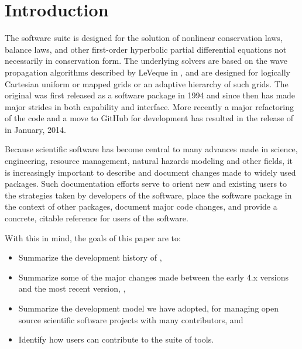 %
%
%

\section{Introduction}\label{sec:intro}

The \clawpack software suite \cite{clawpack} is designed for the solution of
nonlinear conservation laws, balance laws, and other first-order hyperbolic
partial differential equations not necessarily in conservation form.  The
underlying solvers are based on the wave propagation algorithms described by
LeVeque in \cite{rjl:fvmhp}, and are designed for logically Cartesian uniform or
mapped grids or an adaptive hierarchy of such grids.  The original \clawpack was
first released as a software package in 1994 and since then has made major
strides in both capability and interface. More recently a major refactoring of
the code and a move to GitHub for development has resulted in the release of
 in January, 2014.  

Because scientific software  has become central to many advances made
in science, engineering, resource management, natural hazards modeling
and other fields, it is increasingly important to describe and
document changes made to widely used packages.  Such documentation efforts
serve to orient new and existing users to the  strategies
taken by developers of the software, place the software package in the context
of other packages, document major code changes, and provide a
concrete, citable reference for users of the software.

\newpage %
With this in mind, the goals of this paper are to:

\begin{itemize}
\item Summarize the development history of \clawpack,
\item Summarize some of the major changes made between the early \clawpack
4.x versions and the most recent version, ,
\item Summarize the development model we have adopted, for
managing open source scientific software
projects with many contributors, and
\item Identify how users can contribute to the \clawpack suite of tools.
\end{itemize}

